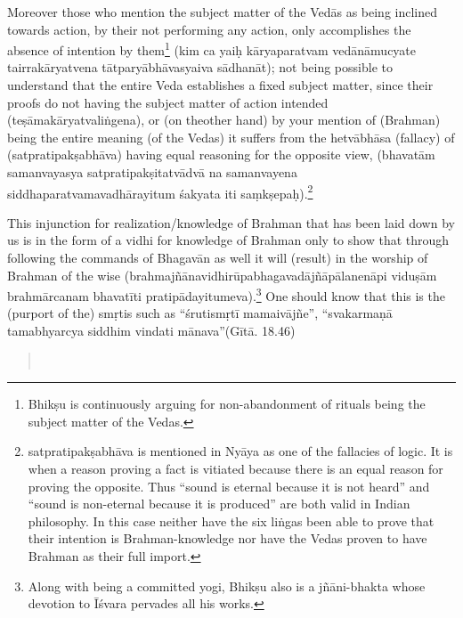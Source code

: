 \vskip 3pt

Moreover those who mention the subject matter of the Vedās as being inclined towards action,  by their not performing any action, only accomplishes the absence of intention by them\footnote{Bhikṣu is continuously arguing for non-abandonment of rituals being the subject matter of the Vedas.} (kim ca yaiḥ kāryaparatvam vedānāmucyate tairrakāryatvena tātparyābhāvasyaiva sādhanāt); not being possible to understand that the entire Veda establishes a fixed subject matter, since their proofs do not having the subject matter of action intended (teṣāmakāryatvaliṅgena),  or (on the\break other hand) by your mention of (Brahman) being the entire meaning (of the Vedas) it suffers from the hetvābhāsa (fallacy) of (satpratipakṣabhāva) having equal reasoning for the opposite view,  (bhavatām samanvayasya satpratipakṣitatvādvā na samanvayena siddhaparatvamavadhārayitum śakyata iti saṃkṣepaḥ).\footnote{satpratipakṣabhāva is mentioned in Nyāya as one of the fallacies of logic. It is when a reason proving a fact is vitiated because there is an equal reason for proving the opposite. Thus “sound is eternal because it is not heard” and “sound is non-eternal because it is produced” are both valid in Indian philosophy. In this case neither have the six liṅgas been able to prove that their intention is Brahman-knowledge nor have the Vedas proven to have Brahman as their full import.} 

\vskip 3pt

This injunction for realization/knowledge of Brahman that has been laid down by us is in the form of a vidhi for knowledge of Brahman  only to show that through following the commands of Bhagavān as well it will (result) in the worship of Brahman of the wise (brahmajñānavidhirūpabhagavadājñāpālanenāpi viduṣām brahmārcanam bhava\-tīti pratipādayitumeva).\footnote{Along with being a committed yogi, Bhikṣu also is a jñāni-bhakta whose devotion to Īśvara pervades all his works.} One should know that this is the (purport of the) smṛtis such as “śrutismṛtī mamaivājñe”, “svakarmaṇā tamabhyarcya siddhim vindati mānava”(Gītā. 18.46)

\vskip 6pt

\begin{verse}
\\[3pt]
\end{verse}

